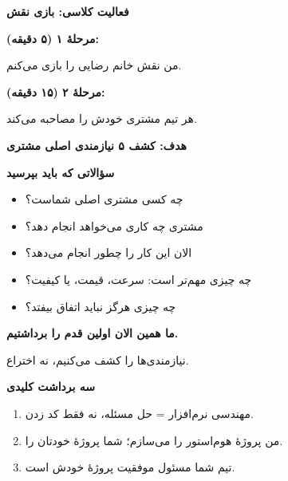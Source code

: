 \documentclass[14pt, a4paper, landscape]{extarticle}
\newcommand{\slide}[1]{%
    \newpage
    \begin{center}
    \begin{minipage}[t]{0.95\textwidth}
    \vspace{0.5cm}
    #1
    \vspace{0.5cm}
    \end{minipage}
    \end{center}
}
\newcommand{\slidetitle}[1]{%
    \begin{center}
        {\LARGE\bfseries\textcolor{primary}{#1}}
    \end{center}
    \vspace{0.5cm}
}
\newcommand{\myaccent}[1]{\textcolor{accent}{#1}}
\begin{document}
\slide{
    \slidetitle{فعالیت کلاسی: بازی نقش}
    \vspace{1cm}
    \begin{center}
        {\Large\bfseries\myaccent{مرحلهٔ ۱ (۵ دقیقه):}}
        
        {\large من نقش خانم رضایی را بازی می‌کنم.}
        
        \vspace{1.5cm}
        
        {\Large\bfseries\myaccent{مرحلهٔ ۲ (۱۵ دقیقه):}}
        
        {\large هر تیم مشتری خودش را مصاحبه می‌کند.}
        
        \vspace{1.5cm}
        
        {\Large\bfseries هدف: کشف ۵ نیازمندی اصلی مشتری}
    \end{center}
}

\slide{
    \slidetitle{سؤالاتی که باید بپرسید}
    \vspace{0.5cm}
    \begin{itemize}[itemsep=0.7em]
        \item چه کسی مشتری اصلی شماست؟
        \item مشتری چه کاری می‌خواهد انجام دهد؟
        \item الان این کار را چطور انجام می‌دهد؟
        \item چه چیزی مهم‌تر است: سرعت، قیمت، یا کیفیت؟
        \item چه چیزی هرگز نباید اتفاق بیفتد؟
    \end{itemize}
}

\slide{
    \begin{center}
        \vspace{2.5cm}
        {\Huge\bfseries ما همین الان اولین قدم را برداشتیم.}
        
        \vspace{1.5cm}
        
        {\LARGE\myaccent{نیازمندی‌ها را کشف می‌کنیم، نه اختراع.}}
    \end{center}
}

\slide{
    \slidetitle{سه برداشت کلیدی}
    \vspace{1cm}
    \begin{enumerate}[itemsep=0.8em]
        \item {\large مهندسی نرم‌افزار = حل مسئله، نه فقط کد زدن.}
        \item {\large من پروژهٔ هوم‌استور را می‌سازم؛ شما پروژهٔ خودتان را.}
        \item {\large تیم شما مسئول موفقیت پروژهٔ خودش است.}
    \end{enumerate}
}
\end{document}
